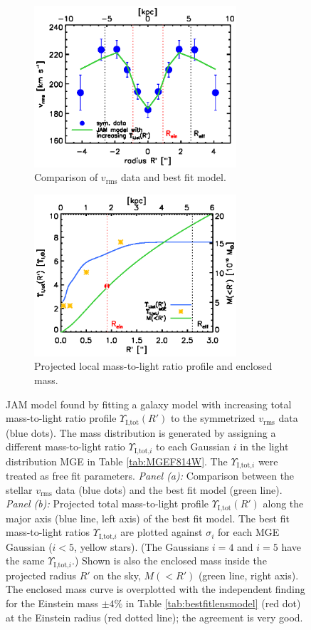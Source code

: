 \documentclass[useAMS,usenatbib]{mnras}
\begin{document}
\begin{figure}
\centering
\begin{subfigure}{.5\textwidth}
  \centering
  \includegraphics[height=6cm]{jam_G_vrms.ps}
  \caption{Comparison of $v_\text{rms}$ data and best fit model.}
  \label{fig:JAM_modelG}
\end{subfigure}%
\begin{subfigure}{.5\textwidth}
  \centering
  \includegraphics[height=6cm]{jam_G_enclMass.ps}
  \caption{Projected local mass-to-light ratio profile and enclosed mass.}
  \label{fig:enclMass_modelG}
\end{subfigure}
\caption{JAM model found by fitting a galaxy model with increasing total mass-to-light ratio profile $\Upsilon_\text{I,tot}(R')$ to the symmetrized $v_\text{rms}$ data (blue dots). The mass distribution is generated by assigning a different mass-to-light ratio $\Upsilon_{\text{I,tot,}i}$ to each Gaussian $i$ in the light distribution MGE in Table \ref{tab:MGEF814W}. The $\Upsilon_{\text{I,tot,}i}$ were treated as free fit parameters. \emph{Panel (a):} Comparison between the stellar $v_\text{rms}$ data (blue dots) and the best fit model (green line). \emph{Panel (b):} Projected total mass-to-light profile $\Upsilon_\text{I,tot}(R')$ along the major axis (blue line, left axis) of the best fit model. The best fit mass-to-light ratios $\Upsilon_{\text{I,tot,}i}$ are plotted against $\sigma_i$ for each MGE Gaussian ($i<5$, yellow stars). (The Gaussians $i=4$ and $i=5$ have the same $\Upsilon_{\text{I,tot,}i}$.) Shown is also the enclosed mass inside the projected radius $R'$ on the sky, $M(<R')$ (green line, right axis). The enclosed mass curve is overplotted with the independent finding for the Einstein mass $\pm 4 \%$ in Table \ref{tab:bestfitlensmodel} (red dot) at the Einstein radius (red dotted line); the agreement is very good.}
\label{fig:modelG}
\end{figure}
\end{document}
